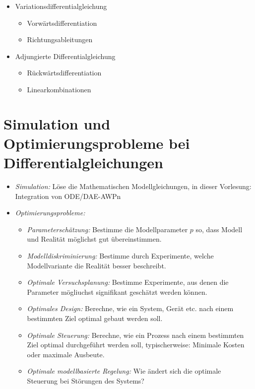 \begin{itemize}
\item Variationsdifferentialgleichung
\begin{itemize}
	\item Vorwärtsdifferentiation
	\item Richtungsableitungen
\end{itemize}
\item Adjungierte Differentialgleichung
\begin{itemize}
	\item Rückwärtsdifferentiation
	\item Linearkombinationen
\end{itemize}
\end{itemize}

\section*{Simulation und Optimierungsprobleme bei Differentialgleichungen}


\begin{itemize}
\item \emph{Simulation:} Löse die Mathematischen Modellgleichungen, in dieser Vorlesung: Integration von ODE/DAE-AWPn
\item \emph{Optimierungsprobleme:}
\begin{itemize}
	\item \emph{Parameterschätzung:} Bestimme die Modellparameter $p$ so, dass Modell und Realität möglichst gut übereinstimmen.
	\item \emph{Modelldiskriminierung:} Bestimme durch Experimente, welche Modellvariante die Realität besser beschreibt.
	\item \emph{Optimale Versuchsplanung:} Bestimme Experimente, aus denen die Parameter mögliuchst signifikant geschätzt werden können.
	\item \emph{Optimales Design:} Berechne, wie ein System, Gerät etc. nach einem bestimmten Ziel optimal gebaut werden soll.
	\item \emph{Optimale Steuerung:} Berechne, wie ein Prozess nach einem bestimmten Ziel optimal durchgeführt werden soll, typischerweise: Minimale Kosten oder maximale Ausbeute.
	\item \emph{Optimale modellbasierte Regelung:} Wie ändert sich die optimale Steuerung bei Störungen des Systems?
\end{itemize}
\end{itemize}


